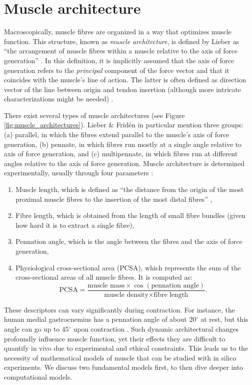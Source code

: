 \documentclass{sfuthesis}
\numberwithin{equation}{section}
\numberwithin{figure}{chapter}
\numberwithin{table}{chapter}
\theoremstyle{definition}
\begin{document}
\section{Muscle architecture} \label{sec:intro_muscle_architecture}

Macroscopically, muscle fibres are organized in a way that optimizes muscle function. This structure, known as \textit{muscle architecture}, is defined by Lieber as ``the arrangement of muscle fibres within a muscle relative to the axis of force generation'' \cite{Lieber2010Book}. In this definition, it is implicitly assumed that the axis of force generation refers to the \textit{principal} component of the force vector and that it coincides with the muscle's line of action. The latter is often defined as direction vector of the line between origin and tendon insertion (although more intricate characterizations might be needed) \cite{Lee20153DPennation}.

There exist several types of muscle architectures (see Figure \ref{fig:muscle_architectures}). Lieber \& Frid\'{e}n \cite{LieberFriden2000} in particular mention three groups: (a) parallel, in which the fibres extend parallel to the muscle's axis of force generation, (b) pennate, in which fibres run mostly at a single angle relative to axis of force generation, and (c) multipennate, in which fibres run at different angles relative to the axis of force generation. Muscle architecture is determined experimentally, usually through four parameters \cite{LieberFriden2000}:
\begin{enumerate}
    \item Muscle length, which is defined as ``the distance from the origin of the most proximal muscle fibres to the insertion of the most distal fibres'' \cite{Lieber2010Book},
    \item Fibre length, which is obtained from the length of small fibre bundles (given how hard it is to extract a single fibre),
    \item Pennation angle, which is the angle between the fibres and the axis of force generation,
    \item Physiological cross-sectional area (PCSA), which represents the sum of the cross-sectional areas of all muscle fibres. It is computed as:
    \[
        \text{PCSA} = \dfrac{\text{muscle mass} \times \cos(\text{pennation angle})}{\text{muscle density} \times \text{fibre length}}.
    \]
\end{enumerate}

These descriptors can vary significantly during contraction. For instance, the human medial gastrocnemius has a pennation angle of about 20$^\circ$ at rest, but this angle can go up to 45$^\circ$ upon contraction \cite{LieberFriden2000}. 
Such dynamic architectural changes profoundly influence muscle function, yet their effects they are difficult to quantify in vivo due to experimental and ethical constraints. This leads us to the necessity of mathematical models of muscle that can be studied with in silico experiments. We discuss two fundamental models first, to then dive deeper into computational models.
\end{document}
